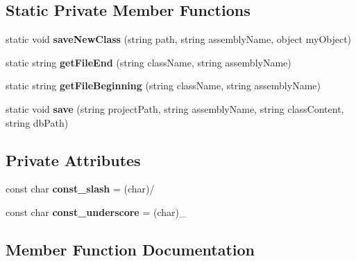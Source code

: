 \subsection*{Static Private Member Functions}
\begin{DoxyCompactItemize}
\item 
\mbox{\label{class_heureka_games_1_1_class_builder_a77a50d5262600f30dd126ff35225c64d}} 
static void {\bfseries save\+New\+Class} (string path, string assembly\+Name, object my\+Object)
\item 
\mbox{\label{class_heureka_games_1_1_class_builder_afd30df598005f1807f509e366ee9638c}} 
static string {\bfseries get\+File\+End} (string class\+Name, string assembly\+Name)
\item 
\mbox{\label{class_heureka_games_1_1_class_builder_a85e5cba6ec62dcf19f08a2490d37f361}} 
static string {\bfseries get\+File\+Beginning} (string class\+Name, string assembly\+Name)
\item 
\mbox{\label{class_heureka_games_1_1_class_builder_af352186a2a6dfea37ef1a1ced678bfe3}} 
static void {\bfseries save} (string project\+Path, string assembly\+Name, string class\+Content, string db\+Path)
\end{DoxyCompactItemize}
\subsection*{Private Attributes}
\begin{DoxyCompactItemize}
\item 
\mbox{\label{class_heureka_games_1_1_class_builder_aed0f0b5627d76f010c111c4cf78ec6f0}} 
const char {\bfseries const\+\_\+slash} = (char)\textquotesingle{}/\textquotesingle{}
\item 
\mbox{\label{class_heureka_games_1_1_class_builder_a20e50289baf68a595af87f9132a8009b}} 
const char {\bfseries const\+\_\+underscore} = (char)\textquotesingle{}\+\_\+\textquotesingle{}
\end{DoxyCompactItemize}


\subsection{Member Function Documentation}
\mbox{\label{class_heureka_games_1_1_class_builder_a509f5dc56fbcd29d6b4f23f7cf77b04e}} 
